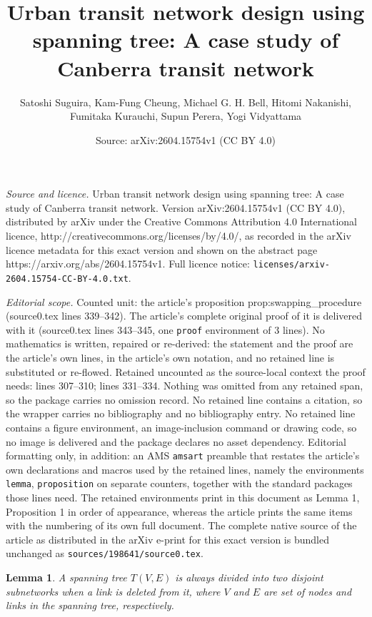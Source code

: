 \documentclass[10pt,a4paper]{amsart}
\title{Urban transit network design using spanning tree: A case study of Canberra transit network}
\author{Satoshi Suguira, Kam-Fung Cheung, Michael G. H. Bell, Hitomi Nakanishi, Fumitaka Kurauchi, Supun Perera, Yogi Vidyattama}
\date{Source: arXiv:2604.15754v1 (CC BY 4.0)}
\newtheorem{lemma}{Lemma}
\begin{document}
\maketitle

\noindent\emph{Source and licence.} Urban transit network design using spanning tree: A case study of Canberra transit network. Version arXiv:2604.15754v1 (CC BY 4.0), distributed by arXiv under the Creative Commons Attribution 4.0 International licence, http://creativecommons.org/licenses/by/4.0/, as recorded in the arXiv licence metadata for this exact version and shown on the abstract page https://arxiv.org/abs/2604.15754v1. Full licence notice: \texttt{licenses/arxiv-2604.15754-CC-BY-4.0.txt}.\par\smallskip

\noindent\textit{Editorial scope.} Counted unit: the article's proposition prop:swapping\_procedure (source0.tex lines 339--342). The article's complete original proof of it is delivered with it (source0.tex lines 343--345, one \texttt{proof} environment of 3 lines). No mathematics is written, repaired or re-derived: the statement and the proof are the article's own lines, in the article's own notation, and no retained line is substituted or re-flowed.  Retained uncounted as the source-local context the proof needs: lines 307--310; lines 331--334.  Nothing was omitted from any retained span, so the package carries no omission record.  No retained line contains a citation, so the wrapper carries no bibliography and no bibliography entry.  No retained line contains a figure environment, an image-inclusion command or drawing code, so no image is delivered and the package declares no asset dependency.  Editorial formatting only, in addition: an AMS \texttt{amsart} preamble that restates the article's own declarations and macros used by the retained lines, namely the environments \texttt{lemma}, \texttt{proposition} on separate counters, together with the standard packages those lines need.  The retained environments print in this document as Lemma 1, Proposition 1 in order of appearance, whereas the article prints the same items with the numbering of its own full document.  The complete native source of the article as distributed in the arXiv e-print for this exact version is bundled unchanged as \texttt{sources/198641/source0.tex}.
\begin{lemma}
  A spanning tree $T\left(V,E\right)$ is always divided into two disjoint subnetworks when a link is deleted from it, where $V$ and $E$ are set of nodes and links in the spanning tree, respectively.
  \label{lem:tree_divided_two_subnetworks}
\end{lemma}
\end{document}
